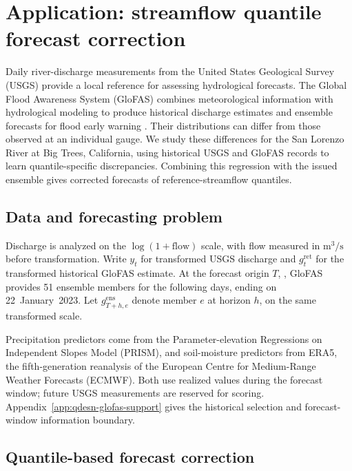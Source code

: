 \section{Application: streamflow quantile forecast correction}
\label{qdesn2026:sec:data}

Daily river-discharge measurements from the United States Geological Survey
(USGS) provide a local reference for assessing hydrological forecasts.
The Global Flood Awareness System (GloFAS) combines meteorological
information with hydrological modeling to produce historical discharge
estimates and ensemble forecasts for flood early warning
\citep{qdesn-AlfieriEtAl2013GloFAS,qdesn-HarriganEtAl2023GloFASForecasts,qdesn-CEMS2026GloFASDocumentation}. Their distributions can differ from those
observed at an individual gauge. We study these differences for the San
Lorenzo River at Big Trees, California, using historical USGS and GloFAS
records to learn quantile-specific discrepancies. Combining this regression
with the issued ensemble gives corrected forecasts of reference-streamflow
quantiles.

\subsection{Data and forecasting problem}

Discharge is analyzed on the \(\log(1+\mathrm{flow})\) scale, with flow
measured in \(\mathrm{m}^3/\mathrm{s}\) before transformation. Write
\(y_t\) for transformed USGS discharge and \(g_t^{\mathrm{ret}}\) for the
transformed historical GloFAS estimate. At the forecast origin \(T\),
\GlofasApplicationCurrentOriginDate{}, GloFAS provides 51 ensemble
members for the following \GlofasApplicationCurrentScoredHorizons{} days,
ending on 22~January~2023. Let \(g_{T+h,e}^{\mathrm{ens}}\) denote member
\(e\) at horizon \(h\), on the same transformed scale.

Precipitation predictors come from the Parameter-elevation Regressions on
Independent Slopes Model (PRISM), and soil-moisture predictors from ERA5,
the fifth-generation reanalysis of the European Centre for Medium-Range
Weather Forecasts (ECMWF). Both use realized values during the forecast
window; future USGS measurements are reserved for scoring.
Appendix~\ref{app:qdesn-glofas-support} gives the historical selection and
forecast-window information boundary.

\subsection{Quantile-based forecast correction}

